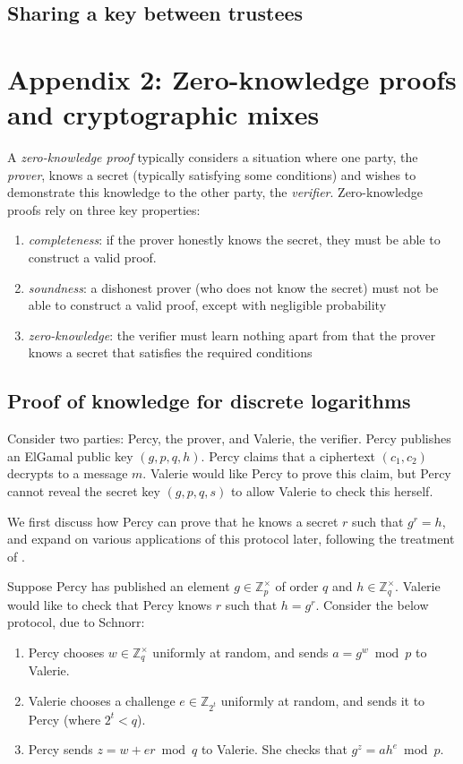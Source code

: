 \documentclass[11pt,twoside,a4paper]{article}
\theoremstyle{definition}
\begin{document}
\subsection{Sharing a key between trustees}

\vfill\pagebreak
\section{Appendix 2: Zero-knowledge proofs and cryptographic mixes}\label{app-proof}
A \textit{zero-knowledge proof} typically considers a situation where one party, the \textit{prover}, knows a secret (typically satisfying some conditions) and wishes to demonstrate this knowledge to the other party, the \textit{verifier}. Zero-knowledge proofs rely on three key properties:
\begin{enumerate}
    \item \textit{completeness}: if the prover honestly knows the secret, they must be able to construct a valid proof.
    \item \textit{soundness}: a dishonest prover (who does not know the secret) must not be able to construct a valid proof, except with negligible probability
    \item \textit{zero-knowledge}: the verifier must learn nothing apart from that the prover knows a secret that satisfies the required conditions
\end{enumerate}
\subsection{Proof of knowledge for discrete logarithms}
Consider two parties: Percy, the prover, and Valerie, the verifier. Percy publishes an ElGamal public key \((g,p,q,h)\). Percy claims that a ciphertext \((c_1, c_2)\) decrypts to a message \(m\). Valerie would like Percy to prove this claim, but Percy cannot reveal the secret key \((g,p,q,s)\) to allow Valerie to check this herself.

We first discuss how Percy can prove that he knows a secret \(r\) such that \(g^r=h\), and expand on various applications of this protocol later, following the treatment of \cite{damgaard2002sigma}.

Suppose Percy has published an element \(g\in\mathbb{Z}^\times_p\) of order \(q\) and \(h\in\mathbb{Z}^\times_q\). Valerie would like to check that Percy knows \(r\) such that \(h=g^r\). Consider the below protocol, due to Schnorr:
\begin{enumerate}
    \item Percy chooses \(w\in\mathbb{Z}^\times_q\) uniformly at random, and sends \(a=g^w\bmod p\) to Valerie.
    \item Valerie chooses a challenge \(e\in\mathbb{Z}_{2^t}\) uniformly at random, and sends it to Percy (where \(2^t<q\)).
    \item Percy sends \(z=w+er\bmod q\) to Valerie. She checks that \(g^z=ah^e\bmod p\).
\end{enumerate}
\end{document}
